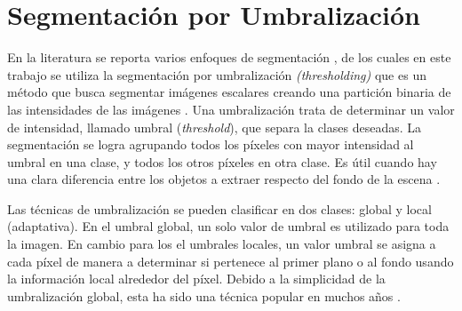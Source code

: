    


\section{Segmentación por Umbralización}
En la literatura se reporta varios enfoques de segmentación \cite{abutaleb1988automatic}, de los cuales en este trabajo se utiliza la  segmentación por umbralización \emph{(thresholding)} que es un método que busca segmentar imágenes escalares creando una partición binaria de las intensidades de las imágenes \cite{coto2003metodos}.
Una umbralización trata de determinar un valor de intensidad, llamado umbral (\textit{threshold}), que separa la clases deseadas. La segmentación se logra agrupando todos los píxeles con mayor intensidad al umbral en una clase, y todos los otros píxeles en otra clase. Es útil cuando hay una clara diferencia entre los objetos a extraer respecto del fondo de la escena \cite{al2010image}.

Las técnicas de umbralización se pueden clasificar en dos clases:  global y local (adaptativa). En el umbral global, un solo valor de umbral es utilizado para toda la imagen. En cambio para los el umbrales locales, un valor umbral se asigna a cada píxel de manera a determinar si pertenece al primer plano o al fondo usando la información local alrededor del píxel. Debido a la simplicidad de la umbralización
global, esta ha sido una técnica popular en muchos años \cite{kittler1986minimum,huang1995image}.

